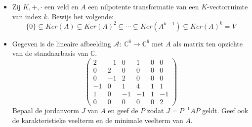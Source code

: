 \documentclass[main.tex]{subfiles}
\begin{document}
\begin{itemize}
\item Zij $K,+,\cdot$ een veld en $A$ een nilpotente transformatie van een $K$-vectorruimte van index $k$.
  Bewijs het volgende:
  \[ \{0\} \subsetneq Ker(A) \subsetneq Ker(A)^{2} \subsetneq \dotsb \subsetneq Ker(A^{k-1}) \subsetneq Ker(A)^{k} = V \]
\item Gegeven is de lineaire afbeelding $\mathcal{A}:\ \mathbb{C}^{6} \rightarrow \mathbb{C}^{6}$ met $A$ als matrix ten opzichte van de standaarbasis van $\mathbb{C}$.
  \[
  \begin{pmatrix}
    2 & -1 & 0 & 1 & 0 & 0\\
    0 & 2 & 0 & 0 & 0 & 0\\
    0 & -1 & 2 & 0 & 0 & 0\\
    -1 & 0 & 1 & 4 & 1 & 1\\
    1 & 0 & -1 & -1 & 1 & -1\\
     0 & 0 & 0 & 0 & 0 & 2
  \end{pmatrix}
  \]
  Bepaal de jordanvorm $J$ van $A$ en geef de $P$ zodat $J=P^{-1}AP$ geldt.
  Geef ook de karakteristieke veelterm en de minimale veelterm van $A$.


\end{itemize}
\end{document}
